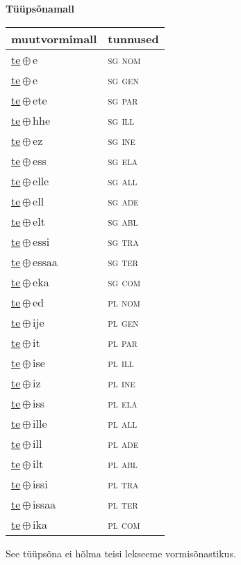 

\vspace{3.5em}
\noindent \begin{minipage}{\textwidth}
\noindent \textbf{Tüüpsõnamall \,}\\

\begin{sideways}
\begin{tabular}{l l}
muutvormimall & tunnused \\
\hline
\underline{te}\,$\oplus$\,e & \textsc{ sg nom } \\
\underline{te}\,$\oplus$\,e & \textsc{ sg gen } \\
\underline{te}\,$\oplus$\,ete & \textsc{ sg par } \\
\underline{te}\,$\oplus$\,hhe & \textsc{ sg ill } \\
\underline{te}\,$\oplus$\,ez & \textsc{ sg ine } \\
\underline{te}\,$\oplus$\,ess & \textsc{ sg ela } \\
\underline{te}\,$\oplus$\,elle & \textsc{ sg all } \\
\underline{te}\,$\oplus$\,ell & \textsc{ sg ade } \\
\underline{te}\,$\oplus$\,elt & \textsc{ sg abl } \\
\underline{te}\,$\oplus$\,essi & \textsc{ sg tra } \\
\underline{te}\,$\oplus$\,essaa & \textsc{ sg ter } \\
\underline{te}\,$\oplus$\,eka & \textsc{ sg com } \\
\underline{te}\,$\oplus$\,ed & \textsc{ pl nom } \\
\underline{te}\,$\oplus$\,ije & \textsc{ pl gen } \\
\underline{te}\,$\oplus$\,it & \textsc{ pl par } \\
\underline{te}\,$\oplus$\,ise & \textsc{ pl ill } \\
\underline{te}\,$\oplus$\,iz & \textsc{ pl ine } \\
\underline{te}\,$\oplus$\,iss & \textsc{ pl ela } \\
\underline{te}\,$\oplus$\,ille & \textsc{ pl all } \\
\underline{te}\,$\oplus$\,ill & \textsc{ pl ade } \\
\underline{te}\,$\oplus$\,ilt & \textsc{ pl abl } \\
\underline{te}\,$\oplus$\,issi & \textsc{ pl tra } \\
\underline{te}\,$\oplus$\,issaa & \textsc{ pl ter } \\
\underline{te}\,$\oplus$\,ika & \textsc{ pl com } \\
\end{tabular}
\end{sideways}
\label{tab:tüüpsõnamall-tee}

\end{minipage}

 
\vspace{1em}
\noindent See tüüpsõna ei hõlma teisi lekseeme vormi\-sõnastikus.
